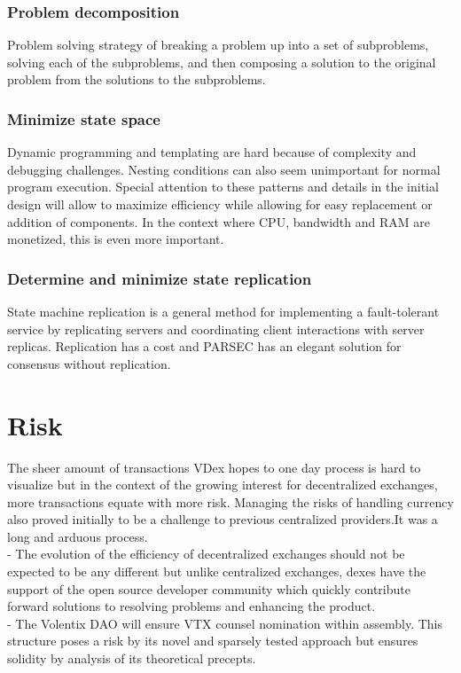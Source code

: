 \documentclass[]{article}
\begin{document}
	\subsubsection{Problem decomposition}
	Problem solving strategy of breaking a problem up into a set of subproblems, solving each of the subproblems, and then composing a solution to the original problem from the solutions to the subproblems.
	\subsubsection{Minimize state space}
	
	Dynamic programming and templating are hard because of complexity and debugging challenges. 
	Nesting conditions can also seem unimportant for normal program execution.
	Special attention to these patterns and details in the initial design will allow to maximize efficiency while allowing for easy replacement or addition of components.   
	In the context where CPU, bandwidth and RAM are monetized, this is even more important. 
	
	\subsubsection{Determine and minimize state replication}
	
	State machine replication is a general method for implementing a fault-tolerant service by replicating servers and coordinating client interactions with server replicas. 
	Replication has a cost and PARSEC has an elegant solution for consensus without replication. 

\section{Risk}
	The sheer amount of transactions VDex hopes to one day process is 
	hard to visualize but in the context of the growing interest for decentralized exchanges, more transactions equate with more risk. 
	Managing the risks of handling currency also proved initially to be a challenge to previous centralized providers.It was a long and arduous process.\\
	- The evolution of the efficiency of decentralized exchanges should not be expected to be any different but unlike centralized exchanges, dexes have the support of the open source developer community which quickly contribute forward solutions to resolving problems and enhancing the product. \\
	- The Volentix DAO will ensure VTX counsel nomination within assembly. This structure poses a risk by its novel and sparsely tested approach but ensures solidity by analysis of its theoretical precepts.   
	
\end{document}
